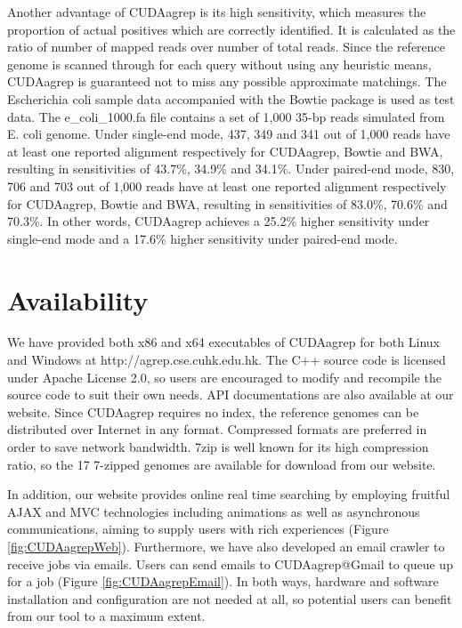 Another advantage of CUDAagrep is its high sensitivity, which measures the proportion of actual positives which are correctly identified. It is calculated as the ratio of number of mapped reads over number of total reads. Since the reference genome is scanned through for each query without using any heuristic means, CUDAagrep is guaranteed not to miss any possible approximate matchings. The Escherichia coli sample data accompanied with the Bowtie package is used as test data. The e\_coli\_1000.fa file contains a set of 1,000 35-bp reads simulated from E. coli genome. Under single-end mode, 437, 349 and 341 out of 1,000 reads have at least one reported alignment respectively for CUDAagrep, Bowtie and BWA, resulting in sensitivities of 43.7\%, 34.9\% and 34.1\%. Under paired-end mode, 830, 706 and 703 out of 1,000 reads have at least one reported alignment respectively for CUDAagrep, Bowtie and BWA, resulting in sensitivities of 83.0\%, 70.6\% and 70.3\%. In other words, CUDAagrep achieves a 25.2\% higher sensitivity under single-end mode and a 17.6\% higher sensitivity under paired-end mode.

\section{Availability}

We have provided both x86 and x64 executables of CUDAagrep for both Linux and Windows at http://agrep.cse.cuhk.edu.hk. The C++ source code is licensed under Apache License 2.0, so users are encouraged to modify and recompile the source code to suit their own needs. API documentations are also available at our website. Since CUDAagrep requires no index, the reference genomes can be distributed over Internet in any format. Compressed formats are preferred in order to save network bandwidth. 7zip is well known for its high compression ratio, so the 17 7-zipped genomes are available for download from our website.

In addition, our website provides online real time searching by employing fruitful AJAX and MVC technologies including animations as well as asynchronous communications, aiming to supply users with rich experiences (Figure \ref{fig:CUDAagrepWeb}). Furthermore, we have also developed an email crawler to receive jobs via emails. Users can send emails to CUDAagrep@Gmail to queue up for a job (Figure \ref{fig:CUDAagrepEmail}). In both ways, hardware and software installation and configuration are not needed at all, so potential users can benefit from our tool to a maximum extent.

